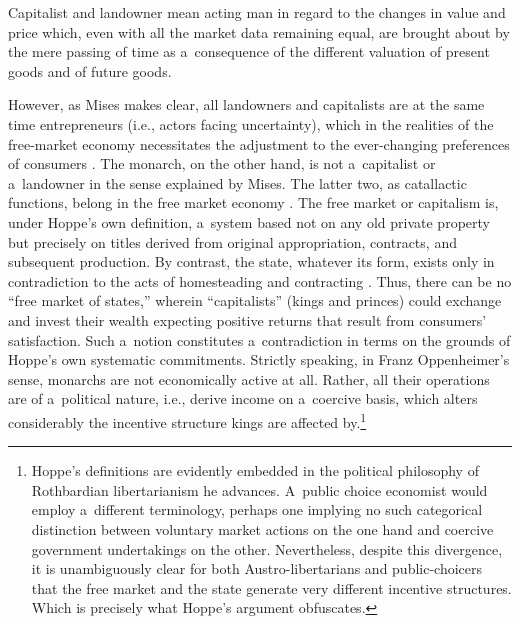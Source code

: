 Capitalist and landowner mean acting man in regard to the changes in value and price which, even with all the market data remaining equal, are brought about by the mere passing of time as a~consequence of the different valuation of present goods and of future goods.



However, as Mises 
\parencite*[][p.254]{mises_human_1998} %
 makes clear, all landowners and capitalists are at the same time entrepreneurs (i.e., actors facing uncertainty), which in the realities of the free-market economy necessitates the adjustment to the ever-changing preferences of consumers 
\parencite*[][pp.270–272]{}. %
 The monarch, on the other hand, is not a~capitalist or a~landowner in the sense explained by Mises. The latter two, as catallactic functions, belong in the free market economy 
\parencite[][pp.252–256]{mises_human_1998}. %
 The free market or capitalism is, under Hoppe's 
\parencites*[][p.20]{hoppe_theory_2016}[cf.][p.92]{rothbard_man_2009}[][p.320]{rothbard_wall_2011} %
 own definition, a~system based not on any old private property but precisely on titles derived from original appropriation, contracts, and subsequent production. By contrast, the state, whatever its form, exists only in contradiction to the acts of homesteading and contracting 
\parencites[][pp.49–52]{hoppe_theory_2016}[][p.877]{rothbard_man_2009}. %
 Thus, there can be no ``free market of states,'' wherein ``capitalists'' (kings and princes) could exchange and invest their wealth expecting positive returns that result from consumers' satisfaction. Such a~notion constitutes a~contradiction in terms on the grounds of Hoppe's own systematic commitments. Strictly speaking, in Franz Oppenheimer's 
\parencite*[][p.25]{oppenheimer_state_1922} %
 sense, monarchs are not economically active at all. Rather, all their operations are of a~political nature, i.e., derive income on a~coercive basis, which alters considerably the incentive structure kings are affected by.\footnote{Hoppe's definitions are evidently embedded in the political philosophy of Rothbardian libertarianism he advances. A~public choice economist would employ a~different terminology, perhaps one implying no such categorical distinction between voluntary market actions on the one hand and coercive government undertakings on the other. Nevertheless, despite this divergence, it is unambiguously clear for both Austro-libertarians and public-choicers that the free market and the state generate very different incentive structures. Which is precisely what Hoppe's argument obfuscates. }



